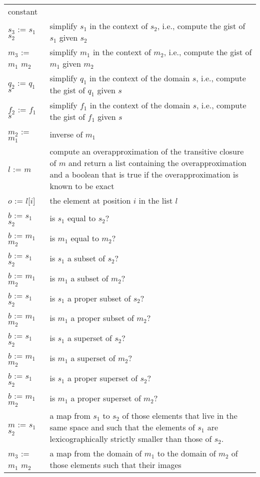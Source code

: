 \begin{supertabular}{p{0.35\textwidth}p{0.6\textwidth}}
constant
\\
$s_3$ := $s_1$ \ai[\tt]{\%} $s_2$ &
simplify $s_1$ in the context of $s_2$, i.e., compute
the gist of $s_1$ given $s_2$
\\
$m_3$ := $m_1$ \ai[\tt]{\%} $m_2$ &
simplify $m_1$ in the context of $m_2$, i.e., compute
the gist of $m_1$ given $m_2$
\\
$q_2$ := $q_1$ \ai[\tt]{\%} $s$ &
simplify $q_1$ in the context of the domain $s$, i.e., compute
the gist of $q_1$ given $s$
\\
$f_2$ := $f_1$ \ai[\tt]{\%} $s$ &
simplify $f_1$ in the context of the domain $s$, i.e., compute
the gist of $f_1$ given $s$
\\
$m_2$ := $m_1$ & inverse of $m_1$
\\
$l$ := $m$\ai[\tt]{\^{}+} &
compute an overapproximation of the transitive closure
of $m$ and return a list containing the overapproximation
and a boolean that is true if the overapproximation
is known to be exact
\\
$o$ := $l$[$i$] &
the element at position $i$ in the list $l$
\\
$b$ := $s_1$ \ai[\tt]{=} $s_2$ & is $s_1$ equal to $s_2$?
\\
$b$ := $m_1$ \ai[\tt]{=} $m_2$ & is $m_1$ equal to $m_2$?
\\
$b$ := $s_1$ \ai[\tt]{<=} $s_2$ & is $s_1$ a subset of $s_2$?
\\
$b$ := $m_1$ \ai[\tt]{<=} $m_2$ & is $m_1$ a subset of $m_2$?
\\
$b$ := $s_1$ \ai[\tt]{<} $s_2$ & is $s_1$ a proper subset of $s_2$?
\\
$b$ := $m_1$ \ai[\tt]{<} $m_2$ & is $m_1$ a proper subset of $m_2$?
\\
$b$ := $s_1$ \ai[\tt]{>=} $s_2$ & is $s_1$ a superset of $s_2$?
\\
$b$ := $m_1$ \ai[\tt]{>=} $m_2$ & is $m_1$ a superset of $m_2$?
\\
$b$ := $s_1$ \ai[\tt]{>} $s_2$ & is $s_1$ a proper superset of $s_2$?
\\
$b$ := $m_1$ \ai[\tt]{>} $m_2$ & is $m_1$ a proper superset of $m_2$?
\\
$m$ := $s_1$ \ai[\tt]{<<} $s_2$ & a map from
$s_1$ to $s_2$ of those elements that live in the same space and
such that the elements of $s_1$ are lexicographically strictly smaller
than those of $s_2$.
\\
$m_3$ := $m_1$ \ai[\tt]{<<} $m_2$ & a map from the domain of
$m_1$ to the domain of $m_2$ of those elements such that their images

\end{supertabular}
